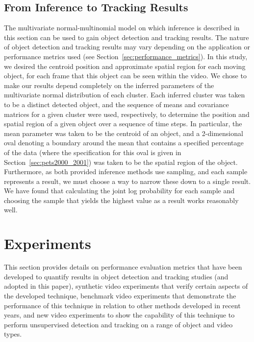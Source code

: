 \documentclass[smallcondensed, final]{svjour3}
\begin{document}
\subsection{From Inference to Tracking Results}
\label{sec:inference_to_results}
The multivariate normal-multinomial model on which inference is described in this section can be used to gain object detection and tracking results. The nature of object detection and tracking results may vary depending on the application or performance metrics used (see Section~\ref{sec:performance_metrics}). In this study, we desired the centroid position and approximate spatial region for each moving object, for each frame that this object can be seen within the video. We chose to make our results depend completely on the inferred parameters of the multivariate normal distribution of each cluster. Each inferred cluster was taken to be a distinct detected object, and the sequence of means and covariance matrices for a given cluster were used, respectively, to determine the position and spatial region of a given object over a sequence of time steps. In particular, the mean parameter was taken to be the centroid of an object, and a 2-dimensional oval denoting a boundary around the mean that contains a specified percentage of the data (where the specification for this oval is given in Section~\ref{sec:pets2000_2001}) was taken to be the spatial region of the object. Furthermore, as both provided inference methods use sampling, and each sample represents a result, we must choose a way to narrow these down to a single result. We have found that calculating the joint log probability for each sample and choosing the sample that yields the highest value as a result works reasonably well.







\section{Experiments}
\label{sec:experiments}

This section provides details on performance evaluation metrics that have been developed to quantify results in object detection and tracking studies (and adopted in this paper), synthetic video experiments that verify certain aspects of the developed technique, benchmark video experiments that demonstrate the performance of this technique in relation to other methods developed in recent years, and new video experiments to show the capability of this technique to perform unsupervised detection and tracking on a range of object and video types.   
\end{document}
